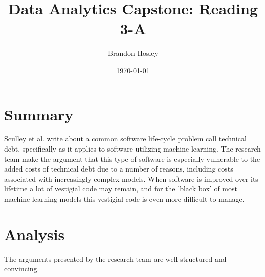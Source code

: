 \documentclass[]{article}
\title{Data Analytics Capstone: Reading 3-A}
\author{Brandon Hosley}
\date{\today}
\begin{document}
	\maketitle
	
\section{Summary} 

Sculley et al.\cite{Sculley2015} write about a common software life-cycle problem call technical debt, specifically as it applies to software utilizing machine learning. 
The research team make the argument that this type of software is especially vulnerable to the added costs of technical debt due to a number of reasons, including costs associated with increasingly complex models.
When software is improved over its lifetime a lot of vestigial code may remain, and for the 'black box' of most machine learning models this vestigial code is even more difficult to manage.


\section{Analysis}

The arguments presented by the research team are well structured and convincing.

\clearpage


\end{document}
